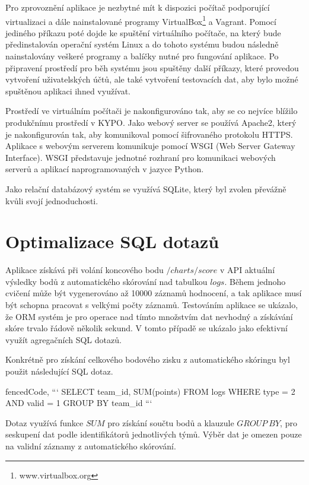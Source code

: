 \documentclass[
  digital, %
  twoside, %
  table,   %
  nolof,     %
  nolot,     %
]{fithesis3}
\begin{document}
Pro zprovoznění aplikace je nezbytné mít k dispozici počítač podporující virtualizaci a dále nainstalované programy VirtualBox\footnote{www.virtualbox.org} a Vagrant. Pomocí jediného příkazu poté dojde ke spuštění virtuálního počítače, na který bude předinstalován operační systém Linux a do tohoto systému budou následně nainstalovány veškeré programy a balíčky nutné pro fungování aplikace. Po připravení prostředí pro běh systému jsou spuštěny další příkazy, které provedou vytvoření uživatelských účtů, ale také vytvoření testovacích dat, aby bylo možné spuštěnou aplikaci ihned využívat. 

Prostředí ve virtuálním počítači je nakonfigurováno tak, aby se co nejvíce blížilo produkčnímu prostředí v KYPO. Jako webový server se používá Apache2, který je nakonfigurován tak, aby komunikoval pomocí šifrovaného protokolu HTTPS. Aplikace s webovým serverem komunikuje pomocí WSGI (Web Server Gateway Interface). WSGI představuje jednotné rozhraní pro komunikaci webových serverů a aplikací naprogramovaných v jazyce Python.

Jako relační databázový systém se využívá SQLite, který byl zvolen převážně kvůli svojí jednoduchosti.

\section{Optimalizace SQL dotazů}

Aplikace získává při volání koncového bodu $/charts/score$ v API aktuální výsledky bodů z automatického skórování nad tabulkou $logs$. Během jednoho cvičení může být vygenerováno až 10000 záznamů hodnocení, a tak aplikace musí být schopna pracovat s velkými počty záznamů. Testováním aplikace se ukázalo, že ORM systém je pro operace nad tímto množstvím dat nevhodný a získávání skóre trvalo řádově několik sekund. V tomto případě se ukázalo jako efektivní využít agregačních SQL dotazů. 

Konkrétně pro získání celkového bodového zisku z automatického skóringu byl použit následující SQL dotaz.

\begin{markdown*}{%
  fencedCode,
}
```
SELECT team_id, SUM(points) FROM logs 
WHERE type = 2 AND valid = 1 
GROUP BY team_id
```
\end{markdown*}

Dotaz využívá funkce $SUM$ pro získání součtu bodů a klauzule $GROUP\ BY$, pro seskupení dat podle identifikátorů jednotlivých týmů. Výběr dat je omezen pouze na validní záznamy z automatického skórování.
\end{document}

